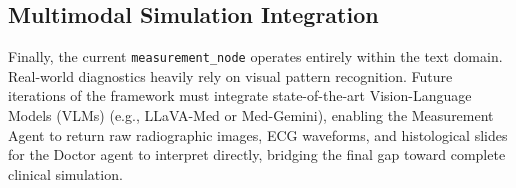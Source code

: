 \documentclass[12pt, a4paper, twoside]{report}
\begin{document}
\subsection{Multimodal Simulation Integration}
Finally, the current \texttt{measurement\_node} operates entirely within the text domain. Real-world diagnostics heavily rely on visual pattern recognition. Future iterations of the framework must integrate state-of-the-art Vision-Language Models (VLMs) (e.g., LLaVA-Med or Med-Gemini), enabling the Measurement Agent to return raw radiographic images, ECG waveforms, and histological slides for the Doctor agent to interpret directly, bridging the final gap toward complete clinical simulation.
\end{document}
